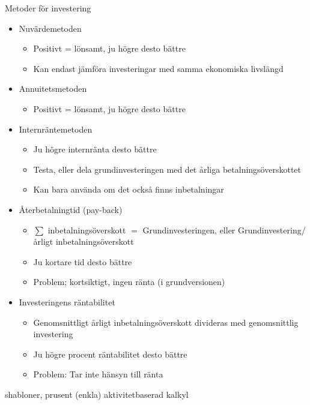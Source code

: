 \documentclass{article}
\begin{document}
Metoder för investering 
\begin{itemize}
    \item Nuvärdemetoden
    \begin{itemize}
        \item Positivt = lönsamt, ju högre desto bättre
        \item Kan endast jämföra investeringar med samma ekonomiska livslängd
    \end{itemize}
    \item Annuitetsmetoden
    \begin{itemize}
        \item Positivt = lönsamt, ju högre desto bättre
    \end{itemize}
    \item Internräntemetoden
    \begin{itemize}
        \item Ju högre internränta desto bättre 
        \item Testa, eller dela grundinvesteringen med det årliga betalningsöverskottet
        \item Kan bara använda om det också finns inbetalningar
    \end{itemize}
    \item Återbetalningtid (pay-back)
    \begin{itemize}
        \item $\sum$ inbetalningsöverskott $=$ Grundinvesteringen, eller Grundinvestering/årligt inbetalningsöverskott
        \item Ju kortare tid desto bättre
        \item Problem; kortsiktigt, ingen ränta (i grundversionen)
    \end{itemize}
    \item Investeringens räntabilitet
    \begin{itemize}
        \item Genomsnittligt årligt inbetalningsöverskott divideras med genomsnittlig investering 
        \item Ju högre procent räntabilitet desto bättre 
        \item Problem: Tar inte hänsyn till ränta
    \end{itemize}
\end{itemize}



shabloner, prusent (enkla)
aktivitetbaserad kalkyl 
\end{document}
